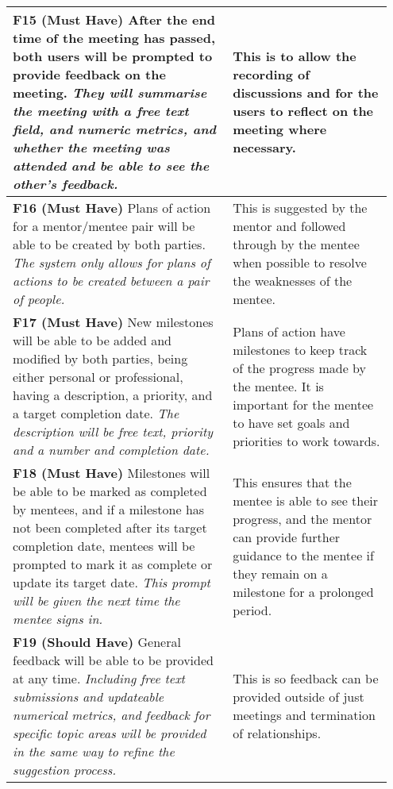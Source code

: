 \documentclass[10pt]{article}
\begin{document}
\begin{longtable}{|p{0.55\linewidth}|p{0.4\linewidth}|}
    \textbf{F15 (Must Have) }
    After the end time of the meeting has passed, both users will be prompted to
    provide feedback on the meeting.
    \textit{They will summarise the meeting with a free text field, and numeric
    metrics, and whether the meeting was attended and be able to see the other's
    feedback.}
        &
    This is to allow the recording of discussions and for the users to reflect
    on the meeting where necessary.
    \\ \hline

    \textbf{F16 (Must Have) }
    Plans of action for a mentor/mentee pair will be able to be created by both
    parties.
    \textit{The system only allows for plans of actions to be created between a
    pair of people.}
        &
    This is suggested by the mentor and followed through by the mentee when
    possible to resolve the weaknesses of the mentee.
    \\ \hline

    \textbf{F17 (Must Have) }
    New milestones will be able to be added and modified by both parties, being
    either personal or professional, having a description, a priority, and a
    target completion date.
    \textit{The description will be free text, priority and a number and
    completion date.}
        &
    Plans of action have milestones to keep track of the progress made by the
    mentee. It is important for the mentee to have set goals and priorities to
    work towards.
    \\ \hline

    \textbf{F18 (Must Have) }
    Milestones will be able to be marked as completed by mentees, and if a
    milestone has not been completed after its target completion date, mentees
    will be prompted to mark it as complete or update its target date.
    \textit{This prompt will be given the next time the mentee signs in.}
        &
    This ensures that the mentee is able to see their progress, and the mentor
    can provide further guidance to the mentee if they remain on a milestone for
    a prolonged period.
    \\ \hline

    \textbf{F19 (Should Have) }                                                     %
    General feedback will be able to be provided at any time.
    \textit{Including free text submissions and updateable numerical metrics,
    and feedback for specific topic areas will be provided in the same way to
    refine the suggestion process.}
        &
    This is so feedback can be provided outside of just meetings and termination
    of relationships.
    \\ \hline


\end{longtable}
\end{document}
